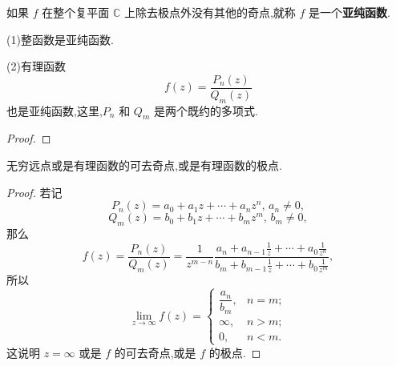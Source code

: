 \documentclass[../../main.tex]{subfiles}
\begin{document}
\begin{definition}
如果 \( f \) 在整个复平面 \( \mathbb{C} \) 上除去极点外没有其他的奇点,就称 \( f \) 是一个\textbf{亚纯函数}.
\end{definition}

\begin{proposition}
(1)整函数是亚纯函数.

(2)有理函数
\[
f(z) = \frac{P_n(z)}{Q_m(z)}
\]
也是亚纯函数,这里,\( P_n \) 和 \( Q_m \) 是两个既约的多项式.
\end{proposition}
\begin{proof}


\end{proof}

\begin{proposition}
无穷远点或是有理函数的可去奇点,或是有理函数的极点.
\end{proposition}
\begin{proof}
若记
\[
P_n(z) = a_0 + a_1 z + \cdots + a_n z^n, \, a_n \neq 0,
\]
\[
Q_m(z) = b_0 + b_1 z + \cdots + b_m z^m, \, b_m \neq 0,
\]
那么
\[
f(z) = \frac{P_n(z)}{Q_m(z)} = \frac{1}{z^{m - n}} \frac{a_n + a_{n - 1} \frac{1}{z} + \cdots + a_0 \frac{1}{z^n}}{b_m + b_{m - 1} \frac{1}{z} + \cdots + b_0 \frac{1}{z^m}},
\]
所以
\[
\lim_{z \to \infty} f(z) = \begin{cases} 
\dfrac{a_n}{b_m}, & n = m; \\
\infty, & n > m; \\
0, & n < m.
\end{cases}
\]
这说明 \( z = \infty \) 或是 \( f \) 的可去奇点,或是 \( f \) 的极点.

\end{proof}
\end{document}
